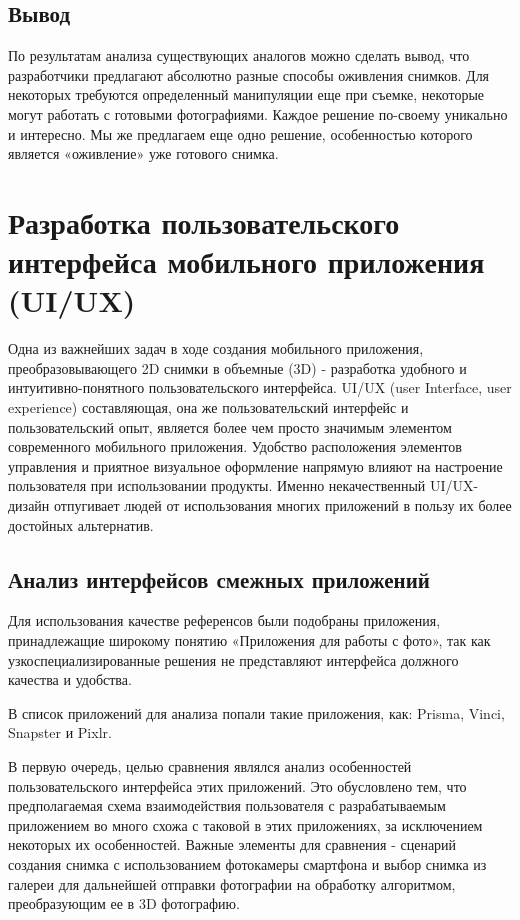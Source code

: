 \subsection{Вывод}
По результатам анализа существующих аналогов можно сделать вывод, что разработчики предлагают абсолютно разные способы оживления снимков. Для некоторых требуются определенный манипуляции еще при съемке, некоторые могут работать с готовыми фотографиями. Каждое решение по-своему уникально и интересно. Мы же предлагаем еще одно решение, особенностью которого является «оживление» уже готового снимка.


\section{Разработка пользовательского интерфейса мобильного приложения (UI/UX)}

Одна из важнейших задач в ходе создания мобильного приложения, преобразовывающего 2D снимки в объемные (3D) - разработка удобного и интуитивно-понятного пользовательского интерфейса. UI/UX (user Interface, user experience) составляющая, она же пользовательский интерфейс и пользовательский опыт, является более чем просто значимым элементом современного мобильного приложения. Удобство расположения элементов управления и приятное визуальное оформление напрямую влияют на настроение пользователя при использовании продукты. Именно некачественный UI/UX-дизайн отпугивает людей от использования многих приложений в пользу их более достойных альтернатив.

\subsection{Анализ интерфейсов смежных приложений}

Для использования качестве референсов были подобраны приложения, принадлежащие широкому понятию «Приложения для работы с фото», так как узкоспециализированные решения не представляют интерфейса должного качества и удобства.

В список приложений для анализа попали такие приложения, как:  Prisma, Vinci, Snapster и Pixlr.

В первую очередь, целью сравнения являлся анализ особенностей пользовательского интерфейса этих приложений. Это обусловлено тем, что предполагаемая схема  взаимодействия пользователя с разрабатываемым приложением во много схожа с таковой в этих приложениях, за исключением некоторых их особенностей. Важные элементы для сравнения  - сценарий создания снимка с использованием фотокамеры смартфона и выбор снимка из галереи для дальнейшей отправки фотографии на обработку алгоритмом, преобразующим ее в 3D фотографию.

